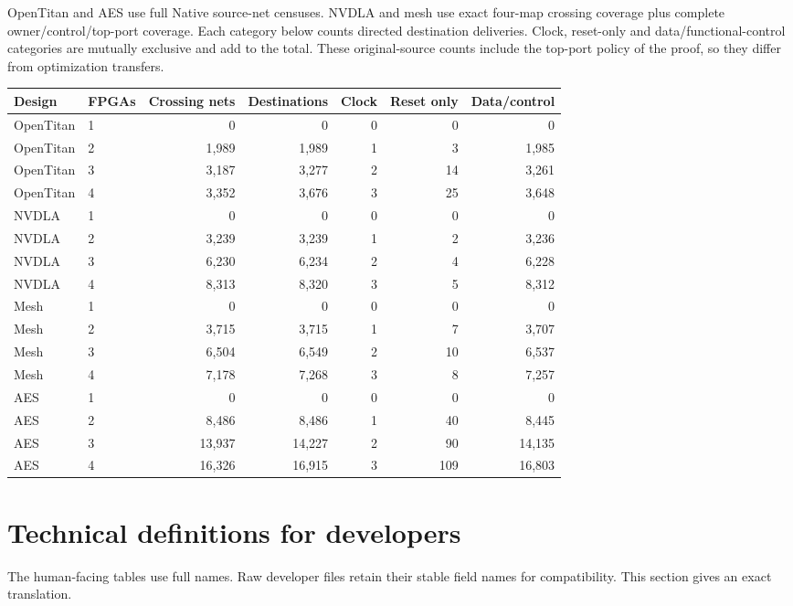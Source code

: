 \documentclass[11pt]{article}
\begin{document}
OpenTitan and AES use full Native source-net censuses. NVDLA and mesh use exact four-map crossing coverage plus complete owner/control/top-port coverage. Each category below counts directed destination deliveries. Clock, reset-only and data/functional-control categories are mutually exclusive and add to the total. These original-source counts include the top-port policy of the proof, so they differ from optimization transfers.

\begin{center}\small
\begin{longtable}{llrrrrr}
\toprule
Design & FPGAs & Crossing nets & Destinations & Clock & Reset only & Data/control\\
\midrule\endhead
OpenTitan & 1 & 0 & 0 & 0 & 0 & 0\\
OpenTitan & 2 & 1,989 & 1,989 & 1 & 3 & 1,985\\
OpenTitan & 3 & 3,187 & 3,277 & 2 & 14 & 3,261\\
OpenTitan & 4 & 3,352 & 3,676 & 3 & 25 & 3,648\\
NVDLA & 1 & 0 & 0 & 0 & 0 & 0\\
NVDLA & 2 & 3,239 & 3,239 & 1 & 2 & 3,236\\
NVDLA & 3 & 6,230 & 6,234 & 2 & 4 & 6,228\\
NVDLA & 4 & 8,313 & 8,320 & 3 & 5 & 8,312\\
Mesh & 1 & 0 & 0 & 0 & 0 & 0\\
Mesh & 2 & 3,715 & 3,715 & 1 & 7 & 3,707\\
Mesh & 3 & 6,504 & 6,549 & 2 & 10 & 6,537\\
Mesh & 4 & 7,178 & 7,268 & 3 & 8 & 7,257\\
AES & 1 & 0 & 0 & 0 & 0 & 0\\
AES & 2 & 8,486 & 8,486 & 1 & 40 & 8,445\\
AES & 3 & 13,937 & 14,227 & 2 & 90 & 14,135\\
AES & 4 & 16,326 & 16,915 & 3 & 109 & 16,803\\
\bottomrule
\end{longtable}
\end{center}

\section{Technical definitions for developers}

The human-facing tables use full names. Raw developer files retain their stable field names for compatibility. This section gives an exact translation.
\end{document}
